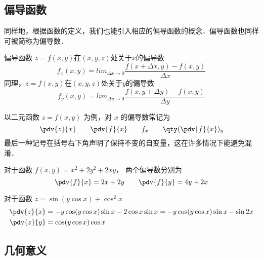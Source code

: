 \subsection{偏导函数}
同样地，根据函数的定义，我们也能引入相应的偏导函数的概念．偏导函数也同样可被简称为偏导数．

\begin{definition}{偏导函数}
$z=f(x,y)$在$(x,y,z)$处关于$x$的偏导数
\begin{equation}
f_x(x,y)=lim_{\Delta x \to 0} \frac{f(x+\Delta x,y)-f(x,y)}{\Delta x}
\end{equation}
同理，$z=f(x,y)$在$(x,y,z)$处关于$y$的偏导数
\begin{equation}
f_y(x,y)=lim_{\Delta y \to 0} \frac{f(x,y+\Delta y)-f(x,y)}{\Delta y}
\end{equation}
\end{definition}

以二元函数 $z=f(x,y)$ 为例，对 $x$ 的偏导数常记为
\begin{equation}\label{ParDer_eq1}
\pdv{z}{x} \qquad \pdv{f}{x} \qquad f_x  \qquad \qty(\pdv{f}{x})_y
\end{equation}
最后一种记号在括号右下角声明了保持不变的自变量，这在许多情况下能避免混淆．


\begin{example}{}\label{ParDer_ex1}
对于函数 $f(x,y) = x^2 + 2 y^2 + 2xy$， 两个偏导数分别为
\begin{equation}
\pdv{f}{x} = 2x + 2y  \qquad  \pdv{f}{y} = 4y + 2x
\end{equation}
\end{example}

\begin{example}{}\label{ParDer_ex2}
对于函数 $z = \sin (y\cos x) + \cos ^2 x$
\begin{equation}
\begin{aligned}
\pdv{z}{x} &=  - y\cos (y\cos x)\sin x - 2\cos x\sin x =  - y\cos (y\cos x)\sin x - \sin 2x\\
\pdv{z}{y} &= \cos (y\cos x)\cos x
\end{aligned}
\end{equation}
\end{example}

\subsection{几何意义}



